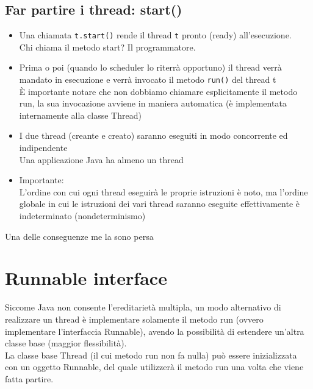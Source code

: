 \subsection{Far partire i thread: start()}
\begin{itemize}
    \item Una chiamata \verb#t.start()# rende il thread \verb#t# pronto (ready) all'esecuzione.
    \\Chi chiama il metodo start? Il programmatore.
    \item Prima o poi (quando lo scheduler lo riterrà opportuno) il thread verrà mandato in esecuzione e verrà invocato il metodo \verb#run()# del thread t
    \\È importante notare che non dobbiamo chiamare esplicitamente il metodo run, la sua invocazione avviene in maniera automatica (è implementata internamente alla classe Thread)
    \item I due thread (creante e creato) saranno eseguiti in modo concorrente ed indipendente
    \\Una applicazione Java ha almeno un thread
    \item Importante:
    \\L'ordine con cui ogni thread eseguirà le proprie istruzioni è noto, ma l'ordine globale in cui le istruzioni dei vari thread saranno eseguite effettivamente è indeterminato (nondeterminismo)
\end{itemize}
Una delle conseguenze me la sono persa

\section{Runnable interface}
Siccome Java non consente l'ereditarietà multipla, un modo alternativo di realizzare un thread è implementare solamente il metodo run (ovvero implementare l'interfaccia Runnable), avendo la possibilità di estendere un'altra classe base (maggior flessibilità).
\\La classe base Thread (il cui metodo run non fa nulla) può essere inizializzata con un oggetto Runnable, del quale utilizzerà il metodo run una volta che viene fatta partire.

